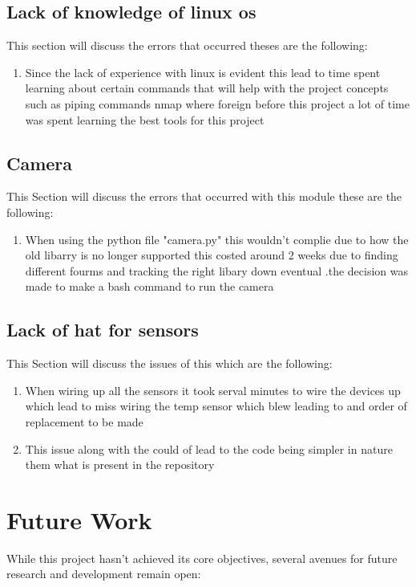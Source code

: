 \subsection{Lack of knowledge of linux os}
This section will discuss the errors that occurred theses are the following:
\begin{enumerate}
    \item Since the lack of experience with linux  is evident  this lead to time spent learning about certain commands that will help with the project concepts such as  piping  commands nmap where  foreign before this project a lot of time was spent learning the best tools for this project
\end{enumerate}
\subsection{Camera}
This Section will discuss the errors that occurred with this module these are the following:
\begin{enumerate}
    \item When using the python file "camera.py" this wouldn't complie due to  how the old libarry is no longer supported this costed around 2 weeks due to finding different fourms and tracking the  right libary down eventual .the decision was made to make a bash command  to run the camera
\end{enumerate}
\subsection{Lack of hat for sensors}
This Section will discuss the issues of this which are  the following:
\begin{enumerate}
    \item When wiring up all the sensors it took serval minutes to wire the devices up which lead to miss wiring the temp sensor which blew  leading to and order of replacement to be made
    \item This issue along with the could of  lead to  the code being simpler in nature them what is present in the repository
\end{enumerate}
\section{Future Work}

While this project hasn't achieved its core objectives, several avenues for future research and development remain open:

